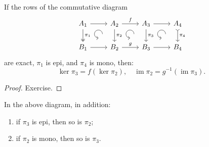 \documentclass[english,letterpaper]{article}%
\numberwithin{equation}{section}
\numberwithin{figure}{section}
\numberwithin{table}{section}
\theoremstyle{definition}
\theoremstyle{definition}
\theoremstyle{definition}
\theoremstyle{plain}
\theoremstyle{plain}
\theoremstyle{plain}
\theoremstyle{plain}
\theoremstyle{remark}
\theoremstyle{remark}
\DeclareMathOperator{\im}{im}
\begin{document}
\begin{lem}[4-lemma]
    If the rows of the commutative diagram
    \[\begin{tikzcd}[every matrix/.append style={name=m},   
        execute at end picture={\draw [<-] ([xshift=-8mm,yshift=-10mm]m-1-2.north) arc[start angle=-90,delta angle=-270,radius=0.2cm];
        \draw [<-] ([xshift=-8mm,yshift=-10mm]m-1-3.north) arc[start angle=-90,delta angle=-270,radius=0.2cm];
        \draw [<-] ([xshift=-8mm,yshift=-10mm]m-1-4.north) arc[start angle=-90,delta angle=-270,radius=0.2cm];}]
        A_1\arrow[r]\arrow[d,two heads,"\pi_1"] & A_2\arrow[r,"f"]\arrow[d,"\pi_2"] & A_3 \arrow[r]\arrow[d,"\pi_3"] & A_4\arrow[d,tail,"\pi_4"] \\
       B_1\arrow[r] & B_2\arrow[r,"g"] & B_3\arrow[r] &B_4
    \end{tikzcd}\]
    are exact, $\pi_1$ is epi, and $\pi_4$ is mono, then:
    \[\ker\pi_3=f(\ker\pi_2),\quad \im\pi_2=g^{-1}(\im \pi_3).\]
\end{lem}
\begin{proof}
    Exercise.
\end{proof}
\begin{cor}
    In the above diagram, in addition:
    \begin{enumerate}
        \item if $\pi_3$ is epi, then so is $\pi_2$;
        \item if $\pi_2$ is mono, then so is $\pi_3$.
    \end{enumerate}
\end{cor}
\end{document}
